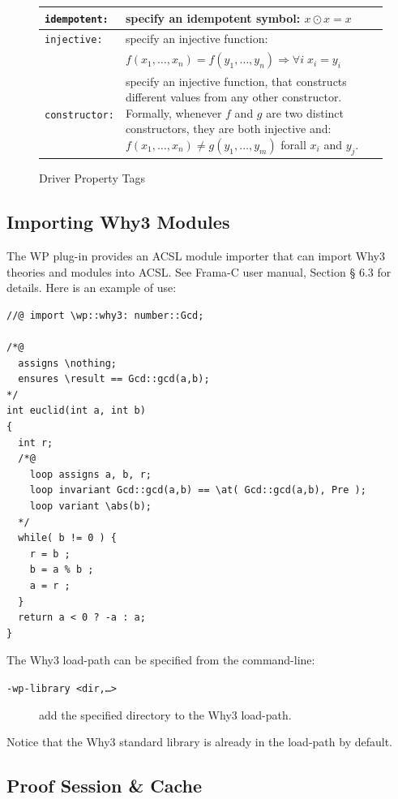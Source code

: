 \begin{figure}[htbp]
\begin{center}
\begin{tabular}{lp{10cm}}
\texttt{idempotent:} & specify an idempotent symbol: $x \odot x = x$ \\
\hline
\texttt{injective:} &  specify an injective function:\\
                      & $f(x_1,\ldots,x_n) = f(y_1,\ldots,y_n) \Longrightarrow \forall i \; x_i = y_i$ \\
\texttt{constructor:} & specify an injective function, that constructs different values
                        from any other constructor. Formally, whenever $f$ and $g$ are two
                        distinct constructors, they are both injective and:
                        $f(x_1,\ldots,x_n) \neq g(y_1,\ldots,y_m)$ forall $x_i$ and $y_j$. \\
\hline
\end{tabular}
\end{center}
\caption{Driver Property Tags}
\label{wp-driver-tags}
\end{figure}

\pagebreak
\subsection{Importing Why3 Modules}
\label{importer}

The \textsf{WP} plug-in provides an \textsf{ACSL} module importer that
can import \textsf{Why3} theories and modules into \textsf{ACSL}.
See \textsf{Frama-C} user manual, Section § 6.3 for details.
Here is an example of use:

\begin{lstlisting}
//@ import \wp::why3: number::Gcd;

/*@
  assigns \nothing;
  ensures \result == Gcd::gcd(a,b);
*/
int euclid(int a, int b)
{
  int r;
  /*@
    loop assigns a, b, r;
    loop invariant Gcd::gcd(a,b) == \at( Gcd::gcd(a,b), Pre );
    loop variant \abs(b);
  */
  while( b != 0 ) {
    r = b ;
    b = a % b ;
    a = r ;
  }
  return a < 0 ? -a : a;
}
\end{lstlisting}

\noindent
The Why3 load-path can be specified from the command-line:
\begin{description}
  \item[\tt -wp-library <dir,\ldots>] add the specified directory to the Why3 load-path.
\end{description}

\noindent
Notice that the Why3 standard library is already in the load-path by default.

\clearpage
\subsection{Proof Session \& Cache}
\label{wp-cache}

